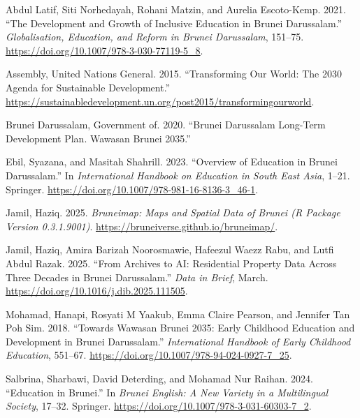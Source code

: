 \documentclass[
  12pt,
]{article}
\newlength{\cslhangindent}
\newenvironment{CSLReferences}[2] %
 {\begin{list}{}{%
  \setlength{\itemindent}{0pt}
  \setlength{\leftmargin}{0pt}
  \setlength{\parsep}{0pt}
  \ifodd #1
   \setlength{\leftmargin}{\cslhangindent}
   \setlength{\itemindent}{-1\cslhangindent}
  \fi
  \setlength{\itemsep}{#2\baselineskip}}}
 {\end{list}}
\begin{document}
\label{refs}
\begin{CSLReferences}{1}{0}
Abdul Latif, Siti Norhedayah, Rohani Matzin, and Aurelia Escoto-Kemp.
2021. {``The Development and Growth of Inclusive Education in Brunei
Darussalam.''} \emph{Globalisation, Education, and Reform in Brunei
Darussalam}, 151--75. \url{https://doi.org/10.1007/978-3-030-77119-5_8}.

Assembly, United Nations General. 2015. {``Transforming Our World: The
2030 Agenda for Sustainable Development.''}
\url{https://sustainabledevelopment.un.org/post2015/transformingourworld}.

Brunei Darussalam, Government of. 2020. {``Brunei Darussalam Long-Term
Development Plan. Wawasan Brunei 2035.''}

Ebil, Syazana, and Masitah Shahrill. 2023. {``Overview of Education in
Brunei Darussalam.''} In \emph{International Handbook on Education in
South East Asia}, 1--21. Springer.
\url{https://doi.org/10.1007/978-981-16-8136-3_46-1}.

Jamil, Haziq. 2025. \emph{Bruneimap: {M}aps and {S}patial {D}ata of
{B}runei ({R} Package Version 0.3.1.9001)}.
\url{https://bruneiverse.github.io/bruneimap/}.

Jamil, Haziq, Amira Barizah Noorosmawie, Hafeezul Waezz Rabu, and Lutfi
Abdul Razak. 2025. {``From {Archives} to {AI:} {Residential} {Property}
{Data} {Across} {Three} {Decades} in {Brunei} {Darussalam}.''}
\emph{Data in Brief}, March.
\url{https://doi.org/10.1016/j.dib.2025.111505}.

Mohamad, Hanapi, Rosyati M Yaakub, Emma Claire Pearson, and Jennifer Tan
Poh Sim. 2018. {``Towards Wawasan Brunei 2035: Early Childhood Education
and Development in Brunei Darussalam.''} \emph{International Handbook of
Early Childhood Education}, 551--67.
\url{https://doi.org/10.1007/978-94-024-0927-7_25}.

Salbrina, Sharbawi, David Deterding, and Mohamad Nur Raihan. 2024.
{``Education in Brunei.''} In \emph{Brunei English: A New Variety in a
Multilingual Society}, 17--32. Springer.
\url{https://doi.org/10.1007/978-3-031-60303-7_2}.

\end{CSLReferences}
\end{document}
